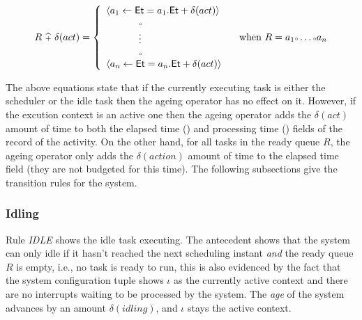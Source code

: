 \begin{equation}
\nonumber
  R\ {\scriptstyle {\widehat{+}}}\ \delta (act) = \left \{
    \begin{array}{l}
      \langle a_1\gets\text{\sffamily Et}=a_1.\text{\sffamily Et}+\delta (act) \rangle \\
      \ \ \ \ \ \ \ \ \ \ {\scriptscriptstyle \circ} \\
      \ \ \ \ \ \ \ \ \ \ \vdots \\
      \ \ \ \ \ \ \ \ \ \ {\scriptscriptstyle \circ} \\
      \langle a_n\gets\text{\sffamily Et}=a_n.\text{\sffamily Et}+\delta (act) \rangle\
    \end{array}
    \quad\text{when}\ R=a_1{\scriptscriptstyle \circ}\ldots{\scriptscriptstyle \circ} a_n
    \right.
\end{equation}



The above equations state that if the currently executing task is
either the scheduler or the idle task then the ageing operator has no
effect on it. However, if the excution context is an active one then
the ageing operator adds the $\delta(act)$ amount of time to both the
elapsed time (\SFT{Et}) and processing time (\SFT{Pt}) fields of the
record of the activity. On the other hand, for all tasks in the ready
queue $R$, the ageing operator only adds the $\delta(action)$ amount
of time to the elapsed time field (they are not budgeted for this
time). The following subsections give the transition rules for the
system. 

\subsubsection{Idling}
Rule \emph{IDLE} shows the idle task executing. The antecedent shows
that the system can only idle if it hasn't reached the next scheduling
instant \SFT{ns} \emph{and} the ready queue $R$ is empty, i.e., no
task is ready to run, this is also evidenced by the fact that the
system configuration tuple shows $\iota$ as the currently active
context and there are no interrupts waiting to be processed by the
system. The \emph{age} of the system advances by an amount
$\delta(idling)$, and $\iota$ stays the active context.

